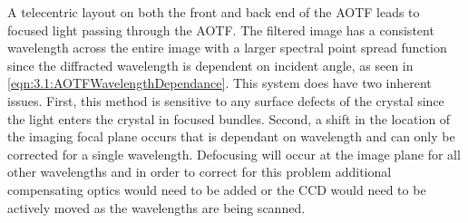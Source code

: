 \documentclass[12pt]{article}
\begin{document}
A telecentric layout on both the front and back end of the AOTF leads to focused light passing through the AOTF. The filtered image has a consistent wavelength across the entire image with a larger spectral point spread function since the diffracted wavelength is dependent on incident angle, as seen in \autoref{eqn:3.1:AOTFWavelengthDependance}. This system does have two inherent issues. First, this method is sensitive to any surface defects of the crystal since the light enters the crystal in focused bundles. Second, a shift in the location of the imaging focal plane occurs that is dependant on wavelength and can only be corrected for a single wavelength. Defocusing will occur at the image plane for all other wavelengths and in order to correct for this problem additional compensating optics would need to be added or the CCD would need to be actively moved as the wavelengths are being scanned.

\end{document}
